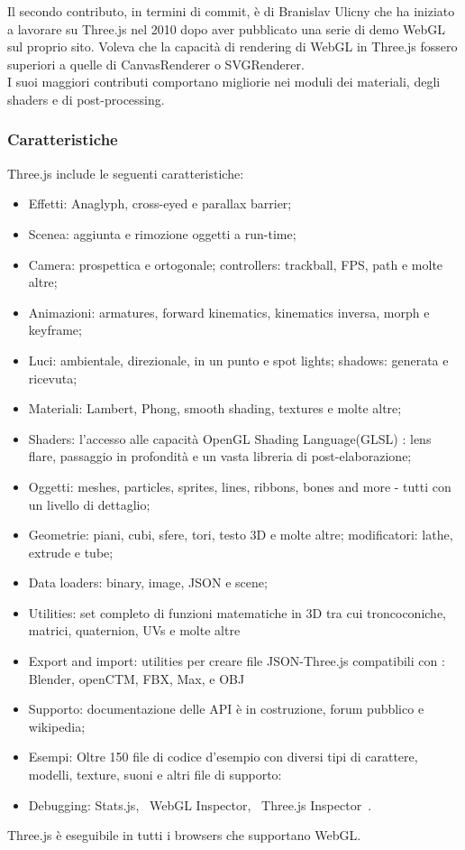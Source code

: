 Il secondo contributo, in termini di commit, è di Branislav Ulicny che ha iniziato a lavorare su Three.js nel 2010
dopo aver pubblicato una serie di demo WebGL sul proprio sito. Voleva che la capacit\`a di rendering di WebGL in Three.js
fossero superiori a quelle di CanvasRenderer o SVGRenderer.~\cite{develop}\\
I suoi maggiori contributi comportano migliorie nei moduli dei materiali, degli shaders e di post-processing.

\subsubsection{Caratteristiche}
Three.js include le seguenti caratteristiche:~\cite{mrdoob}
\begin{itemize}

\item Effetti: Anaglyph, cross-eyed e parallax barrier;
\item Scenea: aggiunta e rimozione oggetti a run-time;
\item Camera: prospettica e ortogonale; controllers: trackball, FPS, path e molte altre;
\item Animazioni: armatures, forward kinematics, kinematics inversa, morph e keyframe;
\item Luci: ambientale, direzionale, in un punto e spot lights; shadows: generata e ricevuta;
\item Materiali: Lambert, Phong, smooth shading, textures e molte altre;
\item Shaders: l'accesso alle capacità OpenGL Shading Language(GLSL) : lens flare, passaggio in profondità e un vasta libreria di post-elaborazione;
\item Oggetti: meshes, particles, sprites, lines, ribbons, bones and more - tutti con un livello di dettaglio;
\item Geometrie: piani, cubi, sfere, tori, testo 3D e molte altre; modificatori: lathe, extrude e tube;
\item Data loaders: binary, image, JSON e scene;
\item Utilities: set completo di funzioni matematiche in 3D tra cui troncoconiche, matrici, quaternion, UVs e molte altre
\item Export and import: utilities per creare file JSON-Three.js compatibili con : Blender, openCTM, FBX, Max, e OBJ
\item Supporto: documentazione delle API è in costruzione, forum pubblico e wikipedia;
\item Esempi: Oltre 150 file di codice d'esempio con diversi tipi di carattere, modelli, texture, suoni e altri file di supporto:
\item Debugging: Stats.js,~\cite{stats.js} WebGL Inspector,~\cite{webglinspector} Three.js Inspector~\cite{threejsinspector}.
\end{itemize}

Three.js è eseguibile in tutti i browsers che supportano WebGL.
